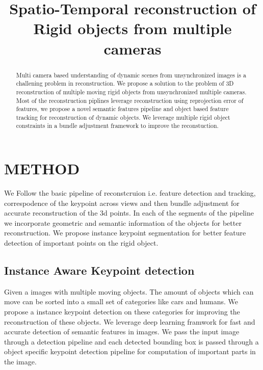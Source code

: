 \documentclass[10pt,twocolumn,letterpaper]{article}
\begin{document}
\title{Spatio-Temporal reconstruction of Rigid objects from multiple cameras}


\maketitle

\begin{abstract}
Multi camera based understanding of dynamic scenes from unsynchronized images is a challening problem in reconstruction. We propose a solution to the problem of 3D reconstruction of multiple moving rigid objects from unsynchronized multiple cameras. Most of the reconstruction piplines leverage reconstruction using reprojection error of features, we propose a novel semantic features pipeline and object based feature tracking for reconstruction of dynamic objects. We leverage multiple rigid object constraints in a bundle adjustment framework to improve the reconstuction. \end{abstract}

\section{METHOD}
We Follow the basic pipeline of reconstcruion i.e. feature detection and tracking, correspodence of the keypoint across views and then bundle adjustment for accurate reconstruction of the 3d points. In each of the segments of the pipeline we incorporate geometric and semantic information of the objects for better reconstruction. We propose instance keypoint segmentation for better feature detection of important points on the rigid object.    

\subsection{Instance Aware Keypoint detection}
Given a images with multiple moving objects. The amount of objects which can move can be sorted into a small set of categories like cars and humans. We propose a instance keypoint detection on these categories for improving the reconstruction of these objects. We leverage deep learning framwork for fast and accurate detection of semantic features in images. We pass the input image through a detection pipeline and each detected bounding box is passed through a object specific keypoint detection pipeline for computation of important parts in the image. 
\end{document}

